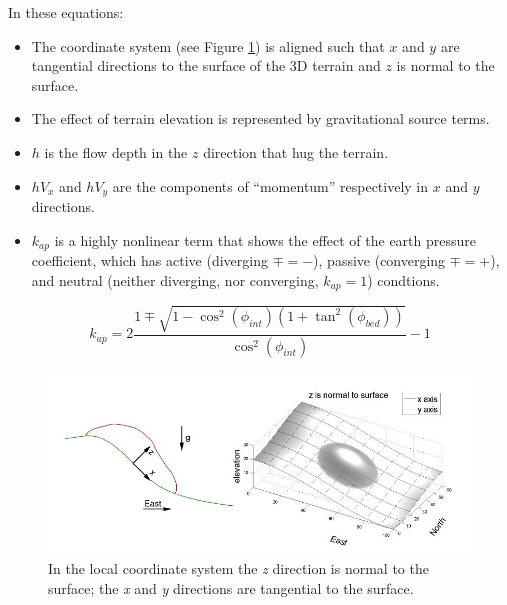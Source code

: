\documentclass[letterpaper,10pt]{article}
\begin{document}
In these equations:
\begin{itemize}
\item The coordinate system (see Figure \ref{xzeast}) is aligned such that $x$ and $y$ are tangential directions 
      to the surface of the 3D terrain and $z$ is normal to the surface.
\item The effect of terrain elevation is represented by gravitational source terms. 
\item $h$ is the flow depth in the $z$ direction that hug the terrain.
\item $hV_x$ and $hV_y$ are the components of ``momentum'' respectively in $x$ and $y$ directions.
\item $k_{ap}$ is a highly nonlinear term that shows the effect of the earth pressure coefficient, which has active 
      (diverging $\mp=-$), passive (converging $\mp=+$), and neutral (neither diverging, nor converging, $k_{ap}=1$) condtions.
\end{itemize}

\begin{equation}
k_{ap}=2\frac{1\mp\sqrt{1-\cos^2(\phi_{int})\left(1+\tan^2(\phi_{bed})\right)}}{\cos^2(\phi_{int})}-1
\end{equation}

\begin{figure}[!t]
\begin{center}
 \includegraphics[height=2.8 truein]{IMAGES/1.jpg}
\caption{In the local coordinate system the {\itshape z} direction is normal to the surface; 
the {\itshape x} and {\itshape y} directions are tangential to the surface.}
\label{xzeast}
\end{center}
\end{figure}
\end{document}
